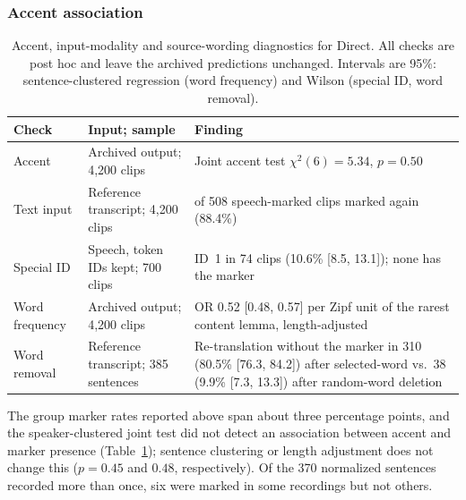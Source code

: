 \subsubsection{Accent association}

\begin{table}[t]
\caption{Accent, input-modality and source-wording diagnostics for Direct. All checks are
post hoc and leave the archived predictions unchanged. Intervals are 95\%:
sentence-clustered regression (word frequency) and Wilson (special ID, word
removal).}
\label{tab:further-diagnostics}
\centering
\footnotesize
\begin{tabularx}{\columnwidth}{@{}>{\raggedright\arraybackslash}p{1.25cm}
  >{\raggedright\arraybackslash}p{2.05cm}>{\raggedright\arraybackslash}X@{}}
\toprule
Check & Input; sample & Finding \\
\midrule
Accent & Archived output; 4,200 clips &
  Joint accent test $\chi^2(6)=5.34$, $p=0.50$ \\
\addlinespace[2pt]
Text input & Reference transcript; 4,200 clips &
  449 of 508 speech-marked clips marked again (88.4\%) \\
\addlinespace[2pt]
Special ID & Speech, token IDs kept; 700 clips &
  ID~1 in 74 clips (10.6\% [8.5, 13.1]); none has the marker \\
\addlinespace[2pt]
Word frequency & Archived output; 4,200 clips &
  OR 0.52 [0.48, 0.57] per Zipf unit of the rarest content lemma,
  length-adjusted \\
\addlinespace[2pt]
Word removal & Reference transcript; 385 sentences &
  Re-translation without the marker in 310 (80.5\% [76.3, 84.2]) after
  selected-word vs.\ 38 (9.9\% [7.3, 13.3]) after random-word deletion \\
\bottomrule
\end{tabularx}
\end{table}

The group marker rates reported above span about three percentage
points, and the speaker-clustered joint test did not detect an association
between accent and marker presence (Table~\ref{tab:further-diagnostics});
sentence clustering or length adjustment does not change this ($p=0.45$ and
$0.48$, respectively). Of the 370 normalized sentences recorded more than
once, six were marked in some recordings but not others.

